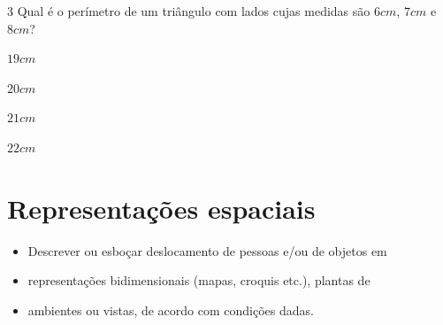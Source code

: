 



\num{3} Qual é o perímetro de um triângulo com lados cujas medidas são $6 cm$,
$7 cm$ e $8 cm$?

\begin{escolha}[itemsep=0pt]
\item $19 cm$
\item $20 cm$
\item $21 cm$ 
\item $22 cm$
\end{escolha}














\chapter{Representações espaciais}

\begin{itemize}
  \item Descrever ou esboçar deslocamento de pessoas e/ou de objetos em
  \item representações bidimensionais (mapas, croquis etc.), plantas de
  \item ambientes ou vistas, de acordo com condições dadas.
\end{itemize}


